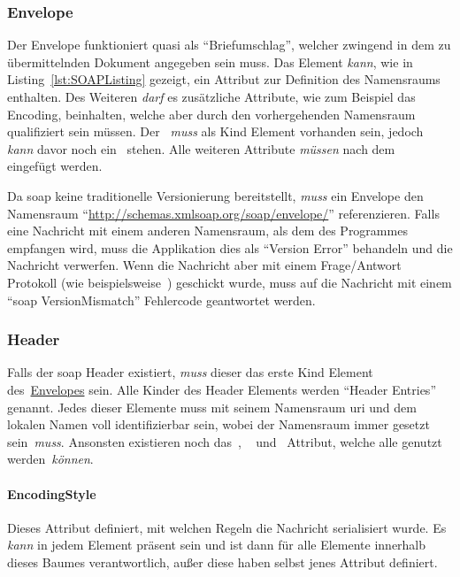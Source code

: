 	\subsubsection{Envelope}\label{subsubsec:soapEnvelope}
		Der Envelope funktioniert quasi als \enquote{Briefumschlag},
		welcher zwingend in dem zu übermittelnden Dokument angegeben sein muss.
		Das Element \textit{kann}, wie in Listing~\ref{lst:SOAPListing} gezeigt,
		ein Attribut zur Definition des Namensraums enthalten.
		Des Weiteren \textit{darf} es zusätzliche Attribute,
		wie zum Beispiel das Encoding, beinhalten,
		welche aber durch den vorhergehenden Namensraum qualifiziert sein müssen.
		Der~ \textit{muss} als Kind Element vorhanden sein,
		jedoch \textit{kann} davor noch ein~ stehen.
		Alle weiteren Attribute \textit{müssen} nach dem~ eingefügt werden.

		Da \gls{soap} keine traditionelle Versionierung bereitstellt,
		\textit{muss} ein Envelope den Namensraum \enquote{\url{http://schemas.xmlsoap.org/soap/envelope/}} referenzieren.
		Falls eine Nachricht mit einem anderen Namensraum, als dem des Programmes empfangen wird,
		muss die Applikation dies als \enquote{Version Error} behandeln und die Nachricht verwerfen.
		Wenn die Nachricht aber mit einem Frage/Antwort Protokoll (wie beispielsweise~) geschickt wurde,
		muss auf die Nachricht mit einem \enquote{\gls{soap} VersionMismatch} Fehlercode geantwortet werden.

	\subsubsection{Header}\label{subsubsec:soapHeader}
		Falls der \gls{soap} Header existiert,
		\textit{muss} dieser das erste Kind Element des~\hyperref[subsubsec:soapEnvelope]{Envelopes} sein.
		Alle Kinder des Header Elements werden \enquote{Header Entries} genannt.
		Jedes dieser Elemente muss mit seinem Namensraum \gls{uri} und dem lokalen Namen voll identifizierbar sein,
		wobei der Namensraum immer gesetzt sein~\textit{muss}.
		Ansonsten existieren noch das~,
		~ und~ Attribut,
		welche alle genutzt werden~\textit{können}.

		\paragraph{EncodingStyle}\label{p:soapEncodingStyle}
			Dieses Attribut definiert, mit welchen Regeln die Nachricht serialisiert wurde.
			Es \textit{kann} in jedem Element präsent sein und ist dann für alle Elemente innerhalb dieses Baumes verantwortlich,
			außer diese haben selbst jenes Attribut definiert.

